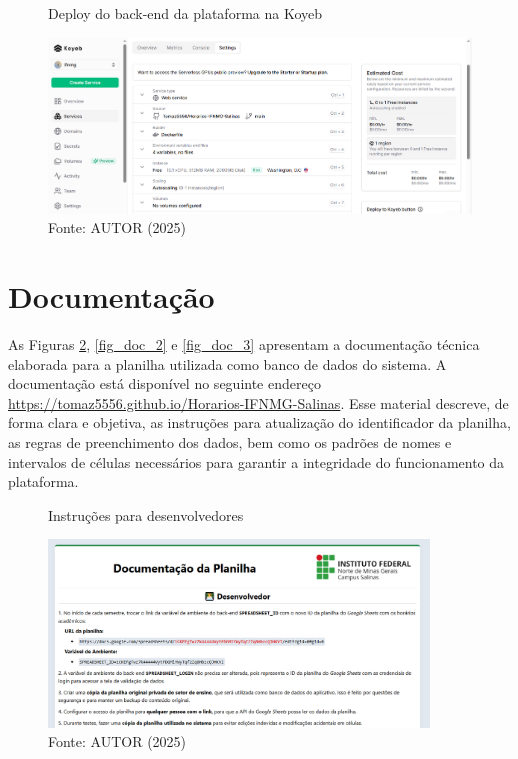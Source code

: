 \begin{figure}[htb]
    \centering
    \caption{Deploy do back-end da plataforma na Koyeb}
    \includegraphics[width=1\textwidth]{Figuras/deploy-2.png}
    \caption*{Fonte: AUTOR (2025)}
    \label{fig_deploy_2}
\end{figure}

\section{Documentação}

As Figuras \ref{fig_doc_1}, \ref{fig_doc_2} e \ref{fig_doc_3} apresentam a documentação técnica elaborada para a planilha utilizada como banco de dados do sistema. A documentação está disponível no seguinte endereço \url{https://tomaz5556.github.io/Horarios-IFNMG-Salinas}. Esse material descreve, de forma clara e objetiva, as instruções para atualização do identificador da planilha, as regras de preenchimento dos dados, bem como os padrões de nomes e intervalos de células necessários para garantir a integridade do funcionamento da plataforma.

\begin{figure}[htb]
    \centering
    \caption{Instruções para desenvolvedores}
    \includegraphics[width=0.9\textwidth]{Figuras/doc-1.png}
    \caption*{Fonte: AUTOR (2025)}
    \label{fig_doc_1}
\end{figure}

